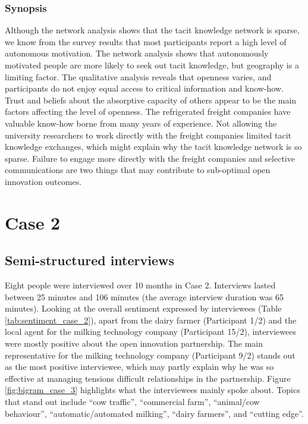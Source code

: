 \subsubsection{Synopsis}

Although the network analysis shows that the tacit knowledge network is sparse, we know from the survey results that most participants report a high level of autonomous motivation. The network analysis shows that autonomously motivated people are more likely to seek out tacit knowledge, but geography is a limiting factor. The qualitative analysis reveals that openness varies, and participants do not enjoy equal access to critical information and know-how. Trust and beliefs about the absorptive capacity of others appear to be the main factors affecting the level of openness. The refrigerated freight companies have valuable know-how borne from many years of experience. Not allowing the university researchers to work directly with the freight companies limited tacit knowledge exchanges, which might explain why the tacit knowledge network is so sparse. Failure to engage more directly with the freight companies and selective communications are two things that may contribute to sub-optimal open innovation outcomes.

\section{Case 2}

\subsection{Semi-structured interviews}

Eight people were interviewed over 10 months in Case 2. Interviews lasted between 25 minutes and 106 minutes (the average interview duration was 65 minutes). Looking at the overall sentiment expressed by interviewees (Table \ref{tab:sentiment_case_2}), apart from the dairy farmer (Participant 1/2) and the local agent for the milking technology company (Participant 15/2), interviewees were mostly positive about the open innovation partnership. The main representative for the milking technology company (Participant 9/2) stands out as the most positive interviewee, which may partly explain why he was so effective at managing tensions difficult relationships in the partnership. Figure \ref{fig:bigram_case_3} highlights what the interviewees mainly spoke about. Topics that stand out include \enquote{cow traffic}, \enquote{commercial farm}, \enquote{animal/cow behaviour}, \enquote{automatic/automated milking}, \enquote{dairy farmers}, and \enquote{cutting edge}.

